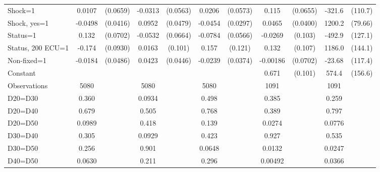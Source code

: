 \begin{tabular}{l|cccccc|cc|cc}
Shock=1         &   0.0107         & (0.0659)&  -0.0313         & (0.0563)&   0.0206         & (0.0573)&    0.115\sym{*}  & (0.0655)&   -321.6\sym{***}&  (110.7)\\
Shock, yes=1    &  -0.0498         & (0.0416)&   0.0952\sym{**} & (0.0479)&  -0.0454         & (0.0297)&   0.0465         & (0.0400)&   1200.2\sym{***}&  (79.66)\\
Status=1        &    0.132\sym{*}  & (0.0702)&  -0.0532         & (0.0664)&  -0.0784         & (0.0566)&  -0.0269         &  (0.103)&   -492.9\sym{***}&  (127.1)\\
Status, 200 ECU=1&   -0.174\sym{*}  & (0.0930)&   0.0163         &  (0.101)&    0.157         &  (0.121)&    0.132         &  (0.107)&   1186.0\sym{***}&  (144.1)\\
Non-fixed=1     &  -0.0184         & (0.0486)&   0.0423         & (0.0446)&  -0.0239         & (0.0374)& -0.00186         & (0.0702)&   -23.68         &  (117.4)\\
Constant        &                  &         &                  &         &                  &         &    0.671\sym{***}&  (0.101)&    574.4\sym{***}&  (156.6)\\
\hline
Observations    &     5080         &         &     5080         &         &     5080         &         &     1091         &         &     1091         &         \\
D20=D30         &    0.360         &         &   0.0934         &         &    0.498         &         &    0.385         &         &    0.259         &         \\
D20=D40         &    0.679         &         &    0.505         &         &    0.768         &         &    0.389         &         &    0.797         &         \\
D20=D50         &   0.0989         &         &    0.418         &         &    0.139         &         &   0.0274         &         &   0.0776         &         \\
D30=D40         &    0.305         &         &   0.0929         &         &    0.423         &         &    0.927         &         &    0.535         &         \\
D30=D50         &    0.256         &         &    0.901         &         &   0.0648         &         &   0.0132         &         &   0.0247         &         \\
D40=D50         &   0.0630         &         &    0.211         &         &    0.296         &         &  0.00492         &         &   0.0366         &         \\

\end{tabular}
